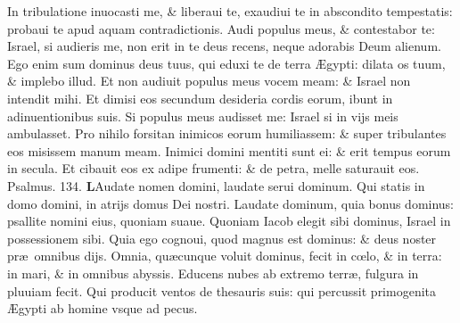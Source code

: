 \documentclass[a5paper,10pt]{book}
\def\ae{æ}
\def\AE{Æ}
\def\oe{œ}
\begin{document}
\begin{multicols*}{2}
\newline \color{red} I\color{black}n tribulatione inuocasti me, \& liberaui te, exaudiui te in abscondito tempestatis: probaui te apud aquam contradictionis.
\newline \color{red} A\color{black}udi populus meus, \& contestabor te: Israel, si audieris me, non erit in te deus recens, neque adorabis Deum alienum.
\newline \color{red} E\color{black}go enim sum dominus deus tuus, qui eduxi te de terra \AE gypti: dilata os tuum, \& implebo illud.
\newline \color{red} E\color{black}t non audiuit populus meus vocem meam: \& Israel non intendit mihi.
\newline \color{red} E\color{black}t dimisi eos secundum desideria cordis eorum, ibunt in adinuentionibus suis.
\newline \color{red} S\color{black}i populus meus audisset me: Israel si in vijs meis ambulasset.
\newline \color{red} P\color{black}ro nihilo forsitan inimicos eorum humiliassem: \& super tribulantes eos misissem manum meam.
\newline \color{red} I\color{black}nimici domini mentiti sunt ei: \& erit tempus eorum in secula.
\newline \color{red} E\color{black}t cibauit eos ex adipe frumenti: \& de petra, melle saturauit eos.
\newline \color{red} Psalmus. \hypertarget{ps134}{134.} \color{black}
\vspace{-.5em}
\lettrine[lines=2]{\bfseries \color{red} L}{}Audate nomen domini, laudate serui dominum.
\newline \color{red} Q\color{black}ui statis in domo domini, in atrijs domus Dei nostri.
\newline \color{red} L\color{black}audate dominum, quia bonus dominus: psallite nomini eius, quoniam suaue.
\newline \color{red} Q\color{black}uoniam Iacob elegit sibi dominus, Israel in possessionem sibi.
\newline \color{red} Q\color{black}uia ego cognoui, quod magnus est dominus: \& deus noster pr\ae \ omnibus dijs.
\newline \color{red} O\color{black}mnia, qu\ae cunque voluit dominus, fecit in c\oe lo, \& in terra: in mari, \& in omnibus abyssis.
\newline \color{red} E\color{black}ducens nubes ab extremo terr\ae , fulgura in pluuiam fecit.
\newline \color{red} Q\color{black}ui producit ventos de thesauris suis: qui percussit primogenita \AE gypti ab homine vsque ad pecus.

\end{multicols*}
\end{document}
